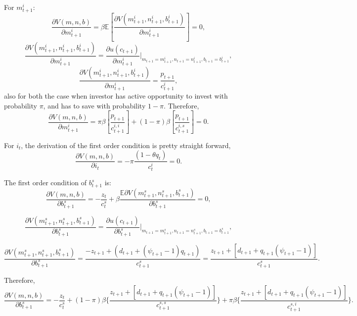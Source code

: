 \documentclass[12pt]{article}%
\begin{document}
For $m^i_{t+1}$:
\begin{equation}
\frac{\partial V(m,n,b)}{\partial m^i_{t+1}}=\beta \mathbb{E}[\frac{\partial V(m^i_{t+1},n^i_{t+1}, b^i_{t+1})}{\partial m^i_{t+1}}]
= 0,
\end{equation}
\begin{equation}
\frac{\partial V(m^i_{t+1},n^i_{t+1},b^i_{t+1})}{\partial m^i_{t+1}}=
\frac{\partial u(c_{t+1})}{\partial m^i_{t+1}}
\bigg|_{m_{t+1}=m^i_{t+1},
n_{t+1}=n^i_{t+1},b_{t+1}=b^i_{t+1}},
\end{equation}
\begin{equation}
\frac{\partial V(m^i_{t+1},n^i_{t+1},b^i_{t+1})}{\partial m^i_{t+1}}=
\frac{p_{t+1}}{c^i_{t+1}},
\end{equation}
also for both the case when investor has active opportunity to invest with
probability $\pi$, and has to save with probability $1-\pi$. Therefore,
\begin{equation}
\frac{\partial V(m,n,b)}{\partial m^i_{t+1}}=
\pi \beta [\frac{p_{t+1}}{c^{i,i}_{t+1}}]+(1-\pi)\beta
[\frac{p_{t+1}}{c^{i,s}_{t+1}}]=0.
\end{equation}

For $i_t$, the derivation of the first order condition is pretty straight
forward,
\begin{equation}
\frac{\partial V(m,n,b)}{\partial i_t}=
-\pi \frac{(1-\theta q_t)}{c^i_t} = 0.
\end{equation}

The first order condition of $b^s_{t+1}$ is:
\begin{equation}
\frac{\partial V(m,n,b)}{\partial b^s_{t+1}}=-\frac{z_t}{c^s_t}+\beta \frac{\mathbb{E}\partial 
V(m^s_{t+1}, n^s_{t+1}, b^s_{t+1})}{\partial b^s_{t+1}}=0,
\end{equation}

\begin{equation}
\frac{\partial V(m^s_{t+1},n^s_{t+1},b^s_{t+1})}{\partial b^s_{t+1}}=
\frac{\partial u(c_{t+1})}{\partial b^s_{t+1}}
\bigg|_{m_{t+1}=m^s_{t+1},
n_{t+1}=n^s_{t+1},b_{t+1}=b^s_{t+1}},
\end{equation}

\begin{equation}
\frac{\partial V(m^s_{t+1},n^s_{t+1},b^s_{t+1})}{\partial b^s_{t+1}}=
\frac{-z_{t+1}+(d_{t+1}+(\psi_{t+1}-1)q_{t+1})}{c^s_{t+1}}
= \frac{z_{t+1}+[d_{t+1}+q_{t+1}(\psi_{t+1}-1)]}{c^s_{t+1}}.
\end{equation}

Therefore,
\begin{equation}
\frac{\partial V(m,n,b)}{\partial b^s_{t+1}}=-\frac{z_t}{c^s_t}
+(1-\pi)\beta \Big\{ \frac{z_{t+1}+[d_{t+1}+q_{t+1}(\psi_{t+1}-1)]}{c^{s,s}_{t+1}}
\Big\} +\pi \beta \Big\{ \frac{z_{t+1}+[d_{t+1}+q_{t+1}(\psi_{t+1}-1)]}{c^{s,i}_{t+1}}\Big\}.
\end{equation}
\end{document}

